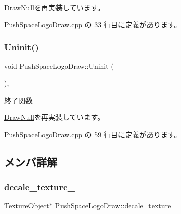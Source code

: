 \mbox{\hyperlink{class_draw_null_acd7fef3ccea1da537ac9507ffbb6dd2e}{Draw\+Null}}を再実装しています。



 Push\+Space\+Logo\+Draw.\+cpp の 33 行目に定義があります。

\mbox{\label{class_push_space_logo_draw_a79021c1df43968d6008de74126d53fba}} 
\subsubsection{\texorpdfstring{Uninit()}{Uninit()}}
{\footnotesize\ttfamily void Push\+Space\+Logo\+Draw\+::\+Uninit (\begin{DoxyParamCaption}{ }\end{DoxyParamCaption})\hspace{0.3cm}{\ttfamily [override]}, {\ttfamily [virtual]}}



終了関数 



\mbox{\hyperlink{class_draw_null_a12d44e341c7364b5ab9cdd661dc16187}{Draw\+Null}}を再実装しています。



 Push\+Space\+Logo\+Draw.\+cpp の 59 行目に定義があります。



\subsection{メンバ詳解}
\mbox{\label{class_push_space_logo_draw_a9a8c0a4328e5b38a65be20f24fab34f8}} 
\subsubsection{\texorpdfstring{decale\+\_\+texture\+\_\+}{decale\_texture\_}}
{\footnotesize\ttfamily \mbox{\hyperlink{class_texture_object}{Texture\+Object}}$\ast$ Push\+Space\+Logo\+Draw\+::decale\+\_\+texture\+\_\+\hspace{0.3cm}{\ttfamily [private]}}



